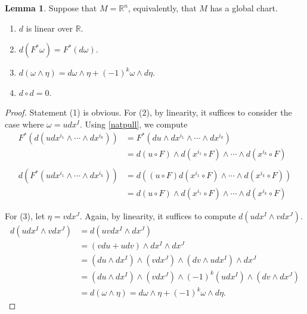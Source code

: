 \documentclass[10pt,letterpaper,cm]{nupset}
\theoremstyle{definition}
\theoremstyle{theorem}
\newtheorem{lemma}[definition]{Lemma}
\theoremstyle{remark}
\newcommand{\R}{\mathbb R}
\newcommand{\1}{\mathbf{1}}
\newcommand{\0}{\vec 0}
\begin{document}
\begin{lemma}\label{l15} Suppose that $M = \R^n$, equivalently, that $M$ has a global chart.
\begin{enumerate}[label=(\arabic*)]
\item $d$ is linear over $\R$.
\item $d(F^{\ast} \omega) = F^{\ast}(d \omega).$
\item $d( \omega \wedge \eta) = d \omega \wedge \eta + \left({-1}\right)^k\omega \wedge d \eta.$
\item $d \circ d = 0$.
\end{enumerate}
\end{lemma}
\begin{proof}
Statement (1) is obvious. For (2), by linearity, it suffices to consider the case where  $\omega = udx^I$. Using \cref{natpull}, we compute
\begin{align*}
F^{*}\left(d\left(u d x^{i_{1}} \wedge \cdots \wedge d x^{i_{k}}\right)\right) &=F^{*}\left(d u \wedge d x^{i_{1}} \wedge \cdots \wedge d x^{i_{k}}\right) \\
&=d(u \circ F) \wedge d\left(x^{i_{1}} \circ F\right) \wedge \cdots \wedge d\left(x^{i_{k}} \circ F\right)
\\ & 
\\ d\left(F^{*}\left(u d x^{i_{1}} \wedge \cdots \wedge d x^{i_{k}}\right)\right) &=d\left((u \circ F) d\left(x^{i_{1}} \circ F\right) \wedge \cdots \wedge d\left(x^{i_{k}} \circ F\right)\right) \\
&=d(u \circ F) \wedge d\left(x^{i_{1}} \circ F\right) \wedge \cdots \wedge d\left(x^{i_{k}} \circ F\right)
\end{align*} 

For (3), let $\eta = v dx^J$. Again, by linearity, it suffices to compute $d(udx^I \wedge v dx^J)$. 
\begin{align*}
d(udx^I \wedge vdx^J) & = d(uvdx^I \wedge dx^J)
\\ & = \left(vdu + udv\right) \wedge dx^I \wedge dx^J
\\ & = \left(du \wedge dx^I\right) \wedge \left(v dx^J\right) \wedge \left(dv \wedge u dx^I\right) \wedge dx^J
\\ & = \left(du \wedge dx^I\right) \wedge \left(v dx^J\right) \wedge \left({-1}\right)^k(udx^I) \wedge \left(dv \wedge dx^J\right)
\\ & = d( \omega \wedge \eta) = d \omega \wedge \eta + \left({-1}\right)^k\omega \wedge d \eta .
\end{align*}


\end{proof}
\end{document}
